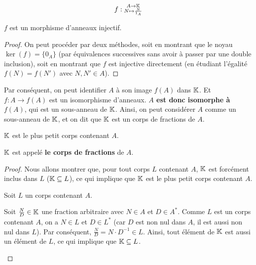 \documentclass[12pt, a4paper]{report}
\begin{document}
\begin{property}
    
    $$f : \substack{A \to \mathbb{K}\\ N \mapsto \frac{N}{1_A}}$$

    $f$ est un morphisme d'anneaux injectif.
\end{property}

\begin{proof}
    On peut procéder par deux méthodes, soit en montrant que le noyau $\ker(f) = \{0_A\}$ (par équivalences successives sans avoir à passer par une double inclusion), soit en montrant que $f$ est injective directement (en étudiant l'égalité $f(N) = f(N')$ avec $N, N' \in A$).
\end{proof}

\begin{remark}
    Par conséquent, on peut identifier $A$ à son image $f(A)$ dans $\mathbb{K}$. Et $f : A \to f(A)$ est un isomorphisme d'anneaux. \textbf{$A$ est donc isomorphe à $f(A)$}, qui est un sous-anneau de $\mathbb{K}$. Ainsi, on peut considérer $A$ comme un sous-anneau de $\mathbb{K}$, et on dit que $\mathbb{K}$ est un corps de fractions de $A$.
\end{remark}

\begin{theorem}
    $\mathbb{K}$ est le plus petit corps contenant $A$.

    $\mathbb{K}$ est appelé \textbf{le corps de fractions} de $A$.
\end{theorem}

\begin{proof}
    Nous allons montrer que, pour tout corps $L$ contenant $A$, $\mathbb{K}$ est forcément inclus dans $L$ ($\mathbb{K} \subseteq L$), ce qui implique que $\mathbb{K}$ est le plus petit corps contenant $A$.

    Soit $L$ un corps contenant $A$.

    \begin{outline}
        \1 Soit $\frac ND \in \mathbb{K}$ une fraction arbitraire avec $N \in A$ et $D \in A^*$. 
        \1 Comme $L$ est un corps contenant $A$, on a $N \in L$ et $D \in L^*$ (car $D$ est non nul dans $A$, il est aussi non nul dans $L$).
        \1 Par conséquent, $\frac ND = N \cdot D^{-1} \in L$.
        \1 Ainsi, tout élément de $\mathbb{K}$ est aussi un élément de $L$, ce qui implique que $\mathbb{K} \subseteq L$.
    \end{outline}
\end{proof}
\end{document}
